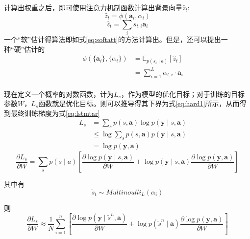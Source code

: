 计算出权重之后，即可使用注意力机制函数计算出背景向量$\hat{z}_t$:
\begin{equation}
    \label{eq:bgvector}
    \hat{z}_t=\phi(\textbf{a}_i,\alpha_i)
\end{equation}
\begin{equation}
    \hat{z}_t = \sum_i s_{t,i}\textbf{a}_i
\end{equation}
一个“软”估计得算法即如式\eqref{eq:softatt}的方法计算出。但是，还可以提出一种“硬”估计的
\begin{equation}
    \begin{aligned}
        &&\phi(\{\textbf{a}_i\},\{\alpha_i\})&= \mathbb{E}_{p(s_t\mid a)} [\hat{z}_t] \\
        && & =\sum_{i=1}^L \alpha_{t,i} \cdot \textbf{a}_i \\
    \end{aligned}
    \label{eq:softatt}
\end{equation}

现在定义一个概率的对数函数，计为$L_s$，作为模型的优化目标；对于训练的目标参数$W$，$L_s$函数就是优化目标。则可以推导得其下界为式\eqref{eq:hard1}所示，从而得到最终训练梯度为式\eqref{eq:lstmtar}
\begin{equation}
    \begin{aligned}
        && L_s &= \sum_s p(s, \textbf{a}) \log p(\textbf{y}\mid {s }, \textbf{a} ) \\
        && & \le \log \sum_sp(s, \textbf{a}) p(\textbf{y}\mid {s }, \textbf{a} ) \\
        && & = \log p(\textbf{y}, \textbf{a})
    \end{aligned}
    \label{eq:hard1}
\end{equation}
\begin{equation}
    \frac{\partial L_s}{\partial W} = \sum_s p(s \mid a) [\frac{\partial \log p(\textbf{y}\mid {s }, \textbf{a} )}{\partial W} + \log p(\textbf{y}\mid {s }, \textbf{a} ) \frac{\partial \log p(\textbf{y}, \textbf{a})}{\partial W} ]
    \label{eq:lstmtar}
\end{equation}

其中有
\begin{equation}
    \tilde{s}_t \sim Multinoulli_L({\alpha_i})
    \label{eq:stdistribute}
\end{equation}

则
\begin{equation}
    \frac{\partial L_s}{\partial W} \approx \frac{1}{N} \sum_{i=1}^{n} [\frac{\partial \log p(\textbf{y}\mid \tilde{s}^n, \textbf{a} )}{\partial W} + \log p(\tilde{s}^n \mid \textbf{a} ) \frac{\partial \log p(\textbf{y}, \textbf{a})}{\partial W} ]
    \label{eq:lstmtar2}
\end{equation}

